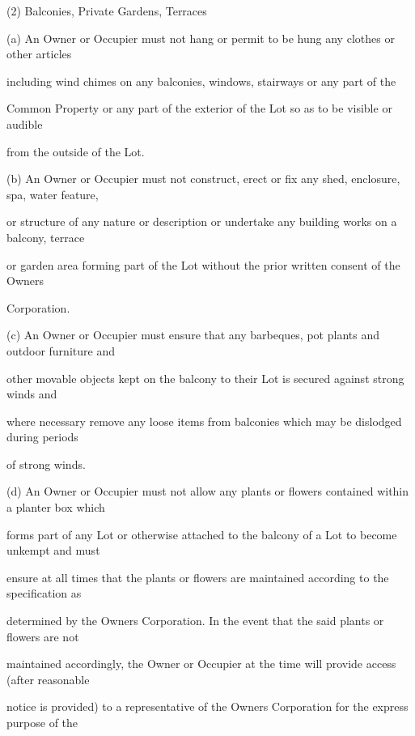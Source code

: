 \documentclass{article}
\begin{document}
{\fontsize{9.962}{1}(2) Balconies, Private Gardens, Terraces }

{\fontsize{9.962}{1}(a) An Owner or Occupier must not hang or permit to be hung any clothes or other articles }

{\fontsize{10.02}{1}including wind chimes on any balconies, windows, stairways or any part of the  }

{\fontsize{10.02}{1}Common Property or any part of the exterior of the Lot so as to be visible or audible }

{\fontsize{10.02}{1}from the outside of the Lot. }

{\fontsize{9.962}{1}(b) An Owner or Occupier must not construct, erect or fix any shed, enclosure, spa, water feature, }

{\fontsize{10.02}{1}or structure of any nature or description or undertake any building works on a balcony, terrace }

{\fontsize{10.02}{1}or garden area forming part of the Lot without the prior written consent of the Owners }

{\fontsize{10.02}{1}Corporation. }

{\fontsize{9.962}{1}(c) An Owner or Occupier must ensure that any barbeques, pot plants and outdoor furniture and }

{\fontsize{10.02}{1}other movable objects kept on the balcony to their Lot is secured against strong winds and }

{\fontsize{10.02}{1}where necessary remove any loose items from balconies which may be dislodged during periods }

{\fontsize{10.02}{1}of strong winds. }

{\fontsize{9.962}{1}(d) An Owner or Occupier must not allow any plants or flowers contained within a planter box which }

{\fontsize{10.02}{1}forms part of any Lot or otherwise attached to the balcony of a Lot to become unkempt and must }

{\fontsize{10.02}{1}ensure at all times that the plants or flowers are maintained according to the specification as }

{\fontsize{10.02}{1}determined by the Owners Corporation. In the event that the said plants or flowers are not }

{\fontsize{10.02}{1}maintained accordingly, the Owner or Occupier at the time will provide access (after reasonable }

{\fontsize{10.02}{1}notice is provided) to a representative of the Owners Corporation for the express purpose of the }
\end{document}
